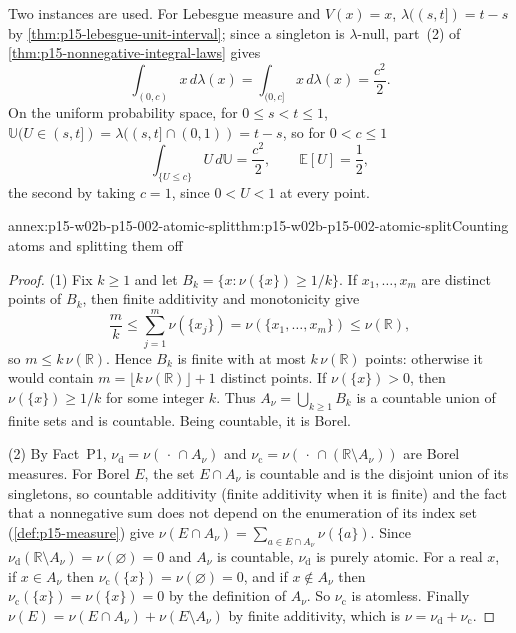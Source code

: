 Two instances are used. For Lebesgue measure and \(V(x)=x\),
\(\lambda((s,t])=t-s\) by \cref{thm:p15-lebesgue-unit-interval}; since
a singleton is \(\lambda\)-null, part~(2) of
\cref{thm:p15-nonnegative-integral-laws} gives
\[
 \int_{(0,c)}x\,d\lambda(x)=\int_{(0,c]}x\,d\lambda(x)=\frac{c^2}{2}.
\]
On the uniform probability space, for \(0\leq s<t\leq1\),
\(\mathbb U(U\in(s,t])=\lambda((s,t]\cap(0,1))=t-s\), so for
\(0<c\leq1\)
\[
 \int_{\{U\leq c\}}U\,d\mathbb U=\frac{c^2}{2},\qquad
 \mathbb E[U]=\frac12,
\]
the second by taking \(c=1\), since \(0<U<1\) at every point.

\begin{annexitem}{annex:p15-w02b-p15-002-atomic-split}{thm:p15-w02b-p15-002-atomic-split}{Counting atoms and splitting them off}
\begin{proof}
(1) Fix \(k\geq1\) and let \(B_k=\{x:\nu(\{x\})\geq1/k\}\). If
\(x_1,\ldots,x_m\) are distinct points of \(B_k\), then finite
additivity and monotonicity give
\[
 \frac mk\leq\sum_{j=1}^m\nu(\{x_j\})=\nu(\{x_1,\ldots,x_m\})
        \leq\nu(\mathbb R),
\]
so \(m\leq k\,\nu(\mathbb R)\). Hence \(B_k\) is finite with at most
\(k\,\nu(\mathbb R)\) points: otherwise it would contain
\(m=\lfloor k\,\nu(\mathbb R)\rfloor+1\) distinct points. If
\(\nu(\{x\})>0\), then \(\nu(\{x\})\geq1/k\) for some integer \(k\).
Thus \(A_\nu=\bigcup_{k\geq1}B_k\) is a countable union of finite sets
and is countable. Being countable, it is Borel.

(2) By Fact~P1, \(\nu_{\mathrm d}=\nu(\,\cdot\,\cap A_\nu)\) and
\(\nu_{\mathrm c}=\nu(\,\cdot\,\cap(\mathbb R\setminus A_\nu))\) are
Borel measures. For Borel \(E\), the set \(E\cap A_\nu\) is countable
and is the disjoint union of its singletons, so countable additivity
(finite additivity when it is finite) and the fact that a nonnegative
sum does not depend on the enumeration of its index set
(\cref{def:p15-measure}) give
\(\nu(E\cap A_\nu)=\sum_{a\in E\cap A_\nu}\nu(\{a\})\). Since
\(\nu_{\mathrm d}(\mathbb R\setminus A_\nu)=\nu(\varnothing)=0\) and
\(A_\nu\) is countable, \(\nu_{\mathrm d}\) is purely atomic. For a
real \(x\), if \(x\in A_\nu\) then
\(\nu_{\mathrm c}(\{x\})=\nu(\varnothing)=0\), and if \(x\notin A_\nu\)
then \(\nu_{\mathrm c}(\{x\})=\nu(\{x\})=0\) by the definition of
\(A_\nu\). So \(\nu_{\mathrm c}\) is atomless. Finally
\(\nu(E)=\nu(E\cap A_\nu)+\nu(E\setminus A_\nu)\) by finite additivity,
which is \(\nu=\nu_{\mathrm d}+\nu_{\mathrm c}\).


\end{proof}
\end{annexitem}
